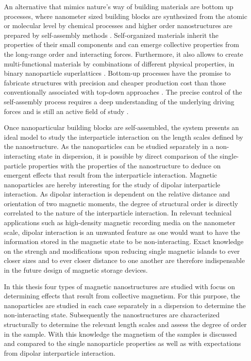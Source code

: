 \documentclass[\main/dresen_thesis.tex]{subfiles}
\begin{document}
  An alternative that mimics nature's way of building materials are bottom up processes, where nanometer sized building blocks are synthesized from the atomic or molecular level by chemical processes and higher order nanostructures are prepared by self-assembly methods \cite{Hannink_2006_Nanos, Whitesides_2002_Selfa}.
  Self-organized materials inherit the properties of their small components and can emerge collective properties from the long-range order and interacting forces.
  Furthermore, it also allows to create multi-functional materials by combinations of different physical properties, \eg in binary nanoparticle superlattices \cite{Redl_2003_Three}.
  Bottom-up processes have the promise to fabricate structures with precision and cheaper production cost than those conventionally associated with top-down approaches \cite{Hannink_2006_Nanos}.
  The precise control of the self-assembly process requires a deep understanding of the underlying driving forces and is still an active field of study \cite{Whitelam_2008_Thero, Powers_2016_Track, Josten_2017_Super}.

  Once nanoparticular building blocks are self-assembled, the system presents an ideal model to study the interparticle interaction on the length scales defined by the nanostructure.
  As the nanoparticles can be studied separately in a non-interacting state in dispersion, it is possible by direct comparison of the single-particle properties with the properties of the nanostructure to deduce on emergent effects that result from the interparticle interaction.
  Magnetic nanoparticles \cite{Lu_2007_Magne, Gubin_2005_Magne} are hereby interesting for the study of dipolar interparticle interaction.
  As dipolar interaction is dependent on the relative distance and orientation of two magnetic moments, the degree of structural order is directly correlated to the nature of the interparticle interaction.
  In relevant technical applications such as high-density magnetic recording media on the nanometer scale, dipolar interaction is an unwanted feature as one would want to have the information stored in the magnetic state to be non-interacting.
  Exact knowledge on the strengh and modifications upon reducing single magnetic islands to ever closer sizes and to ever closer distance to one another are therefore indispensable in the future design of magnetic storage devices.

    In this thesis four types of magnetic nanostructures are studied with focus on determining effects that result from collective magnetism.
    For this purpose, the nanoparticles are studied in each case separately in a dispersion to determine the non-interacting state.
    Subsequently the nanostructures are characterized structurally to determine the relevant length scales and assess the degree of order in the sample.
    With this knowledge the magnetism of the samples is discussed and compared to the single nanoparticle properties as well as with expectations from dipolar interparticle interaction.
\end{document}
